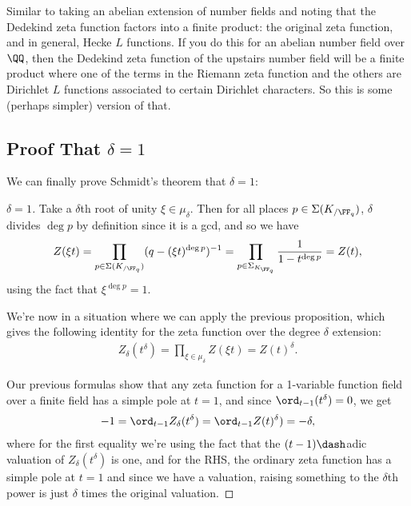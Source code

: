 \begin{remark}

Similar to taking an abelian extension of number fields and noting that
the Dedekind zeta function factors into a finite product: the original
zeta function, and in general, Hecke \(L\) functions. If you do this for
an abelian number field over \(\QQ\), then the Dedekind zeta function of
the upstairs number field will be a finite product where one of the
terms in the Riemann zeta function and the others are Dirichlet \(L\)
functions associated to certain Dirichlet characters. So this is some
(perhaps simpler) version of that.

\end{remark}

\hypertarget{proof-that-delta-1}{%
\subsection{\texorpdfstring{Proof That
\(\delta = 1\)}{Proof That \textbackslash delta = 1}}\label{proof-that-delta-1}}

We can finally prove Schmidt's theorem that \(\delta = 1\):

\begin{proof}[$\delta = 1$]

Take a \(\delta\)th root of unity \(\xi \in \mu_\delta\). Then for all
places \(p \in \Sigma(K_{/\FF_q})\), \(\delta\) divides \(\deg p\) by
definition since it is a gcd, and so we have
\begin{align*}  
Z(\xi t) 
= \prod_{p\in \Sigma(K_{/\FF_q})} (q - (\xi t)^{\deg p} )^{-1} 
= \prod_{p\in \Sigma_{K_{\FF_q}}} {1 \over 1 - t^{\deg p}} = Z(t)
,\end{align*} using the fact that \(\xi^{\deg p} = 1\).

We're now in a situation where we can apply the previous proposition,
which gives the following identity for the zeta function over the degree
\(\delta\) extension:
\begin{align*}  
Z_{\delta}(t^\delta) = \prod_{\xi \in \mu_\delta} Z(\xi t) = Z(t)^\delta
.\end{align*}

Our previous formulas show that any zeta function for a 1-variable
function field over a finite field has a simple pole at \(t=1\), and
since \(\ord_{t-1}(t^\delta) = 0\), we get
\begin{align*}  
-1 = \ord_{t-1} Z_\delta(t^\delta) = \ord_{t-1} Z(t)^\delta) = -\delta
,\end{align*} where for the first equality we're using the fact that the
\((t-1)\dash\)adic valuation of \(Z_\delta(t^\delta)\) is one, and for
the RHS, the ordinary zeta function has a simple pole at \(t=1\) and
since we have a valuation, raising something to the \(\delta\)th power
is just \(\delta\) times the original valuation.

\end{proof}

